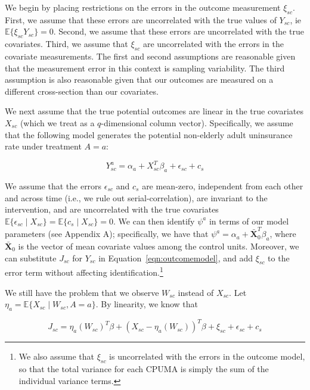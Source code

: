 \documentclass[aoas]{imsart}
\theoremstyle{plain}
\newcommand{\matr}[1]{\mathbf{#1}} %
\theoremstyle{remark}
\begin{document}
We begin by placing restrictions on the errors in the outcome measurement $\xi_{sc}$. First, we assume that these errors are uncorrelated with the true values of $Y_{sc}$, ie $\mathbb{E}\{\xi_{sc}Y_{sc}\} = 0$. Second, we assume that these errors are uncorrelated with the true covariates. Third, we assume that $\xi_{sc}$ are uncorrelated with the errors in the covariate measurements. The first and second assumptions are reasonable given that the measurement error in this context is sampling variability. The third assumption is also reasonable given that our outcomes are measured on a different cross-section than our covariates. 

We next assume that the true potential outcomes are linear in the true covariates $X_{sc}$ (which we treat as a $q$-dimensional column vector). Specifically, we assume that the following model generates the potential non-elderly adult uninsurance rate under treatment $A = a$:

\begin{equation}\label{eqn:outcomemodel}
Y_{sc}^a = \alpha_a + X_{sc}^T\beta_a + \epsilon_{sc} + c_s
\end{equation}

We assume that the errors $\epsilon_{sc}$ and $c_s$ are mean-zero, independent from each other and across time (i.e., we rule out serial-correlation), are invariant to the intervention, and are uncorrelated with the true covariates $\mathbb{E}\{\epsilon_{sc} \mid X_{sc}\} = \mathbb{E}\{c_s \mid X_{sc}\} = 0$. We can then identify $\psi^a$ in terms of our model parameters (see Appendix A); specifically, we have that $\psi^a = \alpha_a + \bar{\matr{X}}_0^T\beta_a$, where $\bar{\matr{X}}_0$ is the vector of mean covariate values among the control units. Moreover, we can substitute $J_{sc}$ for $Y_{sc}$ in Equation~\ref{eqn:outcomemodel}, and add $\xi_{sc}$ to the error term without affecting identification.\footnote{We also assume that $\xi_{sc}$ is uncorrelated with the errors in the outcome model, so that the total variance for each CPUMA is simply the sum of the individual variance terms.} 

We still have the problem that we observe $W_{sc}$ instead of $X_{sc}$. Let $\eta_a = \mathbb{E}\{X_{sc} \mid W_{sc}, A = a\}$. By linearity, we know that

\begin{equation}
    J_{sc} = \eta_a(W_{sc})^T\beta + (X_{sc} - \eta_a(W_{sc}))^T\beta + \xi_{sc} + \epsilon_{sc} + c_s 
\end{equation}
\end{document}
